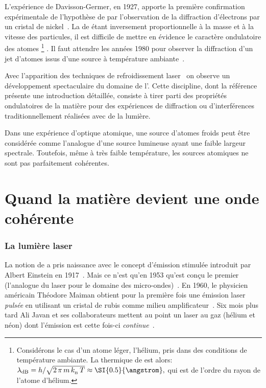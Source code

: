 L'expérience de Davisson-Germer, en 1927, apporte la première confirmation expérimentale de l'hypothèse de \dB par l'observation de la diffraction d'électrons par un cristal de nickel~\cite{DaG27}. 
La \lo de \dB étant inversement proportionnelle à la masse et à la vitesse des particules, il est difficile de mettre en évidence le caractère ondulatoire des atomes%
\footnote
{Considérons le cas d'un atome léger, l'hélium, pris dans des conditions de température ambiante. La \lo thermique de \dB est alors:
$
\lambdaDB = \ttfrac{h}{\sqrt{2\,\pi\,m\,\kb\,T}} \approx \SI{0.5}{\angstrom}
,
$
qui est de l'ordre du rayon de l'atome d'hélium. 
}%
.
%
Il faut attendre les années 1980 pour observer la diffraction d'un jet d'atomes issus d'une source à température ambiante~\cite{MGA83,KSS88}.


\casse


Avec l'apparition des techniques de refroidissement laser~\cite{Phi98,Chu98,Coh98,MeS99} on observe un développement spectaculaire du domaine de l'. Cette discipline, dont la référence~\cite{Mey01} présente une introduction détaillée, consiste à tirer parti des propriétés ondulatoires de la matière pour des expériences de diffraction ou d'interférences traditionnellement réalisées avec de la lumière. 

Dans une expérience d'optique atomique, une source d'atomes froids peut être considérée comme l'analogue d'une source lumineuse ayant une faible largeur spectrale.
Toutefois, même à très faible température, les sources atomiques ne sont pas parfaitement cohérentes. 


\section{Quand la matière devient une onde cohérente}

\subsubsection{La lumière laser}

La notion de  a pris naissance avec le concept d'émission stimulée introduit par Albert Einstein en 1917~\cite{Ein17}. Mais ce n'est qu'en 1953 qu'est conçu le premier  (l'analogue du laser pour le domaine des micro-ondes)~\cite{GZT55}. %
%
En 1960, le physicien américain Théodore Maiman obtient pour la première fois une émission laser \emph{pulsée} en utilisant un cristal de rubis comme milieu amplificateur~\cite{MAI60}. Six mois plus tard Ali Javan et ses collaborateurs mettent au point un laser au gaz (hélium et néon) dont l'émission est cette fois-ci \emph{continue}~\cite{JBH61}.

